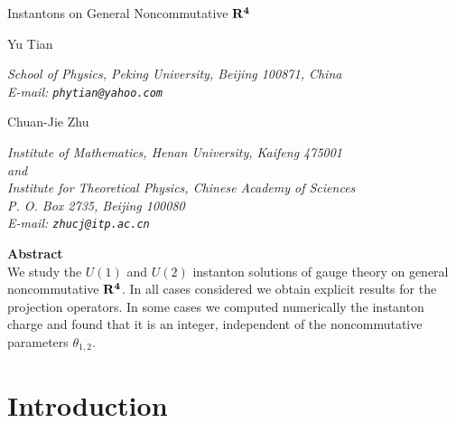 \documentclass[a4paper,a4paper]{article}
\begin{document}
\newcommand{\half}{\frac{1}{2}}

\thispagestyle{empty}

\begin{center}
 {\Large
    Instantons on General Noncommutative $\bf{R}^4$
 }
\end{center}

\vspace*{2cm}
\begin{center}
 \noindent
 {\large Yu Tian}
 \vspace{5mm}
 \noindent
 \hspace{0.7cm} \parbox{142mm}{\it
School of Physics, Peking University, Beijing 100871, China
\\
E-mail: {\tt phytian@yahoo.com}
 }
\end{center}
 \vspace{5mm}
\begin{center}
 \noindent
 {\large Chuan-Jie Zhu}
 \vspace{5mm}
 \noindent
 \hspace{0.7cm} \parbox{142mm}{\it
Institute of Mathematics, Henan University, Kaifeng 475001
\\
and
\\
Institute for Theoretical Physics, Chinese Academy of Sciences
\\
P. O. Box 2735, Beijing 100080
\\
E-mail: {\tt zhucj@itp.ac.cn}
 }
\end{center}

\vspace{2cm}
\hfill{\bf Abstract\ \ }\hfill\ \\

We study the $U(1)$ and $U(2)$ instanton solutions of gauge theory
on general noncommutative $\bf{R}^4$. In all  cases considered we
obtain explicit results for the projection operators. In some
cases we computed numerically the instanton charge and found that
it is an integer, independent of the noncommutative parameters
$\theta_{1,2}$.

\newpage

\section{Introduction}
\end{document}
